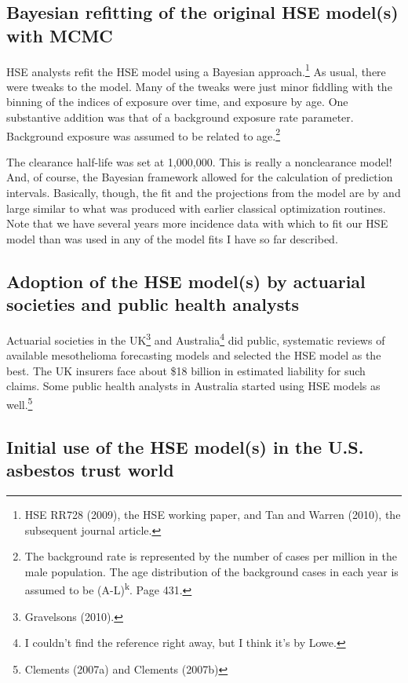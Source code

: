\documentclass{article}\usepackage{graphicx, color}
\begin{document}
\subsection{ Bayesian refitting of the original HSE model(s) with MCMC }

HSE analysts refit the HSE model using a Bayesian approach.\footnote{ HSE RR728 (2009), the HSE working paper, and Tan and Warren (2010), the subsequent journal article.}  As usual, there were tweaks to the model.  Many of the tweaks were just minor fiddling with the binning of the indices of exposure over time, and exposure by age.  One substantive addition was that of a background exposure rate parameter.  Background exposure was assumed to be related to age.\footnote{The background rate is represented by the number of cases per million in the male population. The age distribution of
the background cases in each year is assumed to be (A-L)\textsuperscript{k}. Page 431.} 

The clearance half-life was set at 1,000,000.  This is really a nonclearance model! And, of course, the Bayesian framework allowed for the calculation of prediction intervals.  Basically, though, the fit and the projections from the model are by and large similar to what was produced with earlier classical optimization routines.  Note that we have several years more incidence data with which to fit our HSE model than was used in any of the model fits I have so far described.

\subsection{Adoption of the HSE model(s) by actuarial societies and public health analysts}

Actuarial societies in the UK\footnote{Gravelsons (2010).} and Australia\footnote{I couldn't find the reference right away, but I think it's by Lowe.} did public, systematic reviews of available mesothelioma forecasting models and selected the HSE model as the best.  The UK insurers face about \$18 billion in estimated liability for such claims.  Some public health analysts in Australia started using HSE models as well.\footnote{Clements (2007a) and Clements (2007b)}

\subsection{Initial use of the HSE model(s) in the U.S. asbestos trust world}
\end{document}
